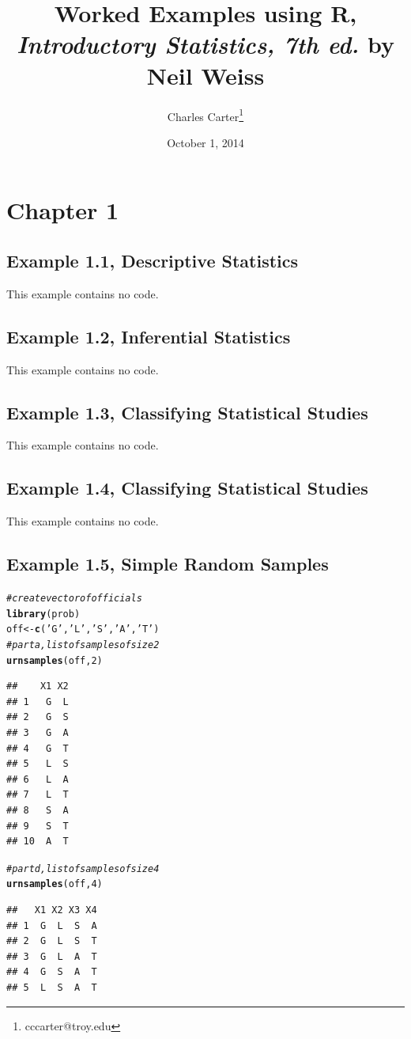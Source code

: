 \documentclass{article}\usepackage[]{graphicx}\usepackage[]{color}
\title{Worked Examples using \textsf{R}, \textit{Introductory Statistics, 7th ed.} by Neil Weiss}
\author{Charles Carter\thanks{cccarter@troy.edu}}
\date{October 1, 2014}
\makeatletter
\newcommand{\hlnum}[1]{\textcolor[rgb]{0.686,0.059,0.569}{#1}}%
\newcommand{\hlstr}[1]{\textcolor[rgb]{0.192,0.494,0.8}{#1}}%
\newcommand{\hlcom}[1]{\textcolor[rgb]{0.678,0.584,0.686}{\textit{#1}}}%
\newcommand{\hlstd}[1]{\textcolor[rgb]{0.345,0.345,0.345}{#1}}%
\newcommand{\hlkwb}[1]{\textcolor[rgb]{0.69,0.353,0.396}{#1}}%
\newcommand{\hlkwd}[1]{\textcolor[rgb]{0.737,0.353,0.396}{\textbf{#1}}}%
\newenvironment{kframe}{%
 \def\at@end@of@kframe{}%
 \ifinner\ifhmode%
  \def\at@end@of@kframe{\end{minipage}}%
  \begin{minipage}{\columnwidth}%
 \fi\fi%
 \def\FrameCommand##1{\hskip\@totalleftmargin \hskip-\fboxsep
 \colorbox{shadecolor}{##1}\hskip-\fboxsep
     \hskip-\linewidth \hskip-\@totalleftmargin \hskip\columnwidth}%
 \MakeFramed {\advance\hsize-\width
   \@totalleftmargin\z@ \linewidth\hsize
   \@setminipage}}%
 {\par\unskip\endMakeFramed%
 \at@end@of@kframe}
\newenvironment{knitrout}{}{} %
\makeatother
\begin{document}
\maketitle{}
\tableofcontents{}


\section{Chapter 1}

\subsection{Example 1.1, Descriptive Statistics}This example contains no code.
\subsection{Example 1.2, Inferential Statistics}This example contains no code.
\subsection{Example 1.3, Classifying Statistical Studies}This example contains no code.
\subsection{Example 1.4, Classifying Statistical Studies}This example contains no code.
\subsection{Example 1.5, Simple Random Samples}
\begin{knitrout}
\color{fgcolor}\begin{kframe}
\begin{alltt}
\hlcom{#create vector of officials}
\hlkwd{library}\hlstd{(prob)}
\hlstd{off} \hlkwb{<-} \hlkwd{c}\hlstd{(}\hlstr{'G'}\hlstd{,} \hlstr{'L'}\hlstd{,} \hlstr{'S'}\hlstd{,} \hlstr{'A'}\hlstd{,} \hlstr{'T'}\hlstd{)}
\hlcom{#part a, list of samples of size 2}
\hlkwd{urnsamples}\hlstd{(off,} \hlnum{2}\hlstd{)}
\end{alltt}
\begin{verbatim}
##    X1 X2
## 1   G  L
## 2   G  S
## 3   G  A
## 4   G  T
## 5   L  S
## 6   L  A
## 7   L  T
## 8   S  A
## 9   S  T
## 10  A  T
\end{verbatim}
\begin{alltt}
\hlcom{#part d, list of samples of size 4}
\hlkwd{urnsamples}\hlstd{(off,} \hlnum{4}\hlstd{)}
\end{alltt}
\begin{verbatim}
##   X1 X2 X3 X4
## 1  G  L  S  A
## 2  G  L  S  T
## 3  G  L  A  T
## 4  G  S  A  T
## 5  L  S  A  T
\end{verbatim}
\end{kframe}
\end{knitrout}
\end{document}
